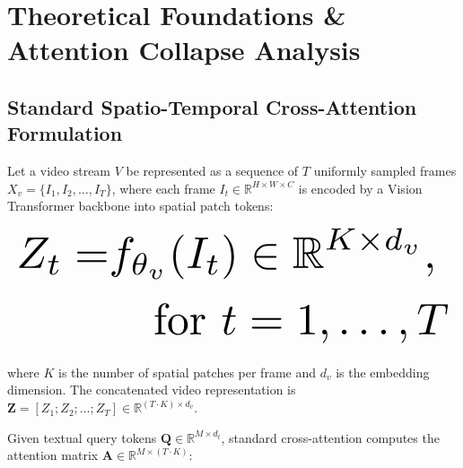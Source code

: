 \documentclass{article}
\begin{document}
\section{Theoretical Foundations \& Attention Collapse Analysis}



\subsection{Standard Spatio-Temporal Cross-Attention Formulation}


Let a video stream $V$ be represented as a sequence of $T$ uniformly sampled frames $X_v = \{I_1, I_2, \ldots, I_T\}$, where each frame $I_t \in \mathbb{R}^{H \times W \times C}$ is encoded by a Vision Transformer backbone into spatial patch tokens:

























\begin{equation}
\resizebox{\columnwidth}{!}{$\displaystyle
\begin{aligned}
Z_t = & f_{\theta_v}(I_t) \in \mathbb{R}^{K \times d_v}, \\
& \quad \text{for } t = 1, \ldots, T
\end{aligned}
$}
\end{equation}

























where $K$ is the number of spatial patches per frame and $d_v$ is the embedding dimension. The concatenated video representation is $\mathbf{Z} = [Z_1; Z_2; \ldots; Z_T] \in \mathbb{R}^{(T \cdot K) \times d_v}$.

Given textual query tokens $\mathbf{Q} \in \mathbb{R}^{M \times d_t}$, standard cross-attention computes the attention matrix $\mathbf{A} \in \mathbb{R}^{M \times (T \cdot K)}$:
\end{document}

